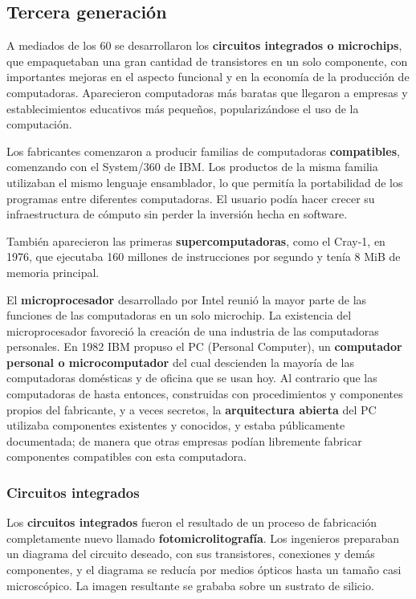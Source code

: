\documentclass[spanish,a4paper,]{article}
\begin{document}
\hypertarget{tercera-generaciuxf3n}{%
\subsection{Tercera generación}\label{tercera-generaciuxf3n}}

A mediados de los 60 se desarrollaron los \textbf{circuitos integrados o
microchips}, que empaquetaban una gran cantidad de transistores en un
solo componente, con importantes mejoras en el aspecto funcional y en la
economía de la producción de computadoras. Aparecieron computadoras más
baratas que llegaron a empresas y establecimientos educativos más
pequeños, popularizándose el uso de la computación.

Los fabricantes comenzaron a producir familias de computadoras
\textbf{compatibles}, comenzando con el System/360 de IBM. Los productos
de la misma familia utilizaban el mismo lenguaje ensamblador, lo que
permitía la portabilidad de los programas entre diferentes computadoras.
El usuario podía hacer crecer su infraestructura de cómputo sin perder
la inversión hecha en software.

También aparecieron las primeras \textbf{supercomputadoras}, como el
Cray-1, en 1976, que ejecutaba 160 millones de instrucciones por segundo
y tenía 8 MiB de memoria principal.

El \textbf{microprocesador} desarrollado por Intel reunió la mayor parte
de las funciones de las computadoras en un solo microchip. La existencia
del microprocesador favoreció la creación de una industria de las
computadoras personales. En 1982 IBM propuso el PC (Personal Computer),
un \textbf{computador personal o microcomputador} del cual descienden la
mayoría de las computadoras domésticas y de oficina que se usan hoy. Al
contrario que las computadoras de hasta entonces, construidas con
procedimientos y componentes propios del fabricante, y a veces secretos,
la \textbf{arquitectura abierta} del PC utilizaba componentes existentes
y conocidos, y estaba públicamente documentada; de manera que otras
empresas podían libremente fabricar componentes compatibles con esta
computadora.

\hypertarget{circuitos-integrados}{%
\subsubsection{Circuitos integrados}\label{circuitos-integrados}}

Los \textbf{circuitos integrados} fueron el resultado de un proceso de
fabricación completamente nuevo llamado \textbf{fotomicrolitografía}.
Los ingenieros preparaban un diagrama del circuito deseado, con sus
transistores, conexiones y demás componentes, y el diagrama se reducía
por medios ópticos hasta un tamaño casi microscópico. La imagen
resultante se grababa sobre un sustrato de silicio.
\end{document}
